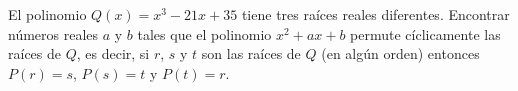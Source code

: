 El polinomio $Q(x)=x^3-21x+35$ tiene tres raíces reales diferentes. Encontrar números reales $a$ y $b$ tales que el polinomio $x^2+ax+b$ permute cíclicamente las raíces de $Q$, es decir, si $r$, $s$ y $t$ son las raíces de $Q$ (en algún orden) entonces $P(r)=s$, $P(s)=t$ y $P(t)=r$.
